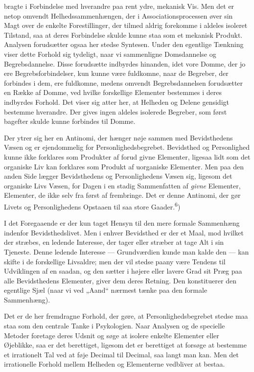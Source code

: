 \documentclass[12pt,a4paper,openany]{book}
\newcommand{\opage}[1]{\marginnote{\footnotesize\textit{[#1]}}}
\begin{document}
bragte i Forbindelse med hverandre paa rent ydre, mekanisk Vis. Men det er
netop omvendt Helhedssammenhængen, der i Associationsprocessen øver sin Magt
over de enkelte Forestillinger, der tilmed aldrig forekomme i aldeles isoleret
Tilstand, saa at deres Forbindelse skulde kunne staa som et mekanisk Produkt.
Analysen forudsætter ogsaa her stedse Syntesen. Under den egentlige Tænkning
viser dette Forhold sig tydeligt, naar vi sammenligne Domsdannelse og
Begrebsdannelse. Disse forudsætte indbyrdes hinanden, idet vore Domme, der jo
ere Begrebsforbindelser, kun kunne være fuldkomne, naar de Begreber, der
forbindes i dem, ere fuldkomne, medens omvendt Begrebsdannelsen forudsætter en
Række af Domme, ved hvilke forskellige Elementer bestemmes i deres indbyrdes
Forhold. Det viser sig atter her, at Helheden og Delene gensidigt bestemme
hverandre. Der gives ingen aldeles isolerede Begreber, som først bagefter
skulde kunne forbindes til Domme.

Der ytrer sig her en Antinomi, der hænger nøje sammen med Bevidsthedens Væsen
og er ejendommelig for Personlighedsbegrebet. Bevidsthed og Personlighed kunne
ikke forklares som Produkter af forud givne Elementer, ligesaa lidt som det
organiske Liv kan forklares som Produkt af uorganiske Elementer. Men paa den
anden Side lægger Bevidsthedens og Personlighedens Væsen sig, ligesom det
organiske Livs Væsen,
\opage{10}for Dagen i en stadig Sammenfatten af \textit{givne} Elementer,
Elementer, de ikke selv fra først af frembringe. Det er denne Antinomi, der gør
Livets og Personlighedens Opstaaen til saa store Gaader.\textsuperscript{6})

I det Foregaaende er der kun taget Hensyn til den mere formale Sammenhæng
indenfor Bevidsthedslivet. Men i enhver Bevidsthed er der et Maal, mod hvilket
der stræbes, en ledende Interesse, der tager eller stræber at tage Alt i sin
Tjeneste. Denne ledende Interesse --- Grundværdien kunde man kalde den --- kan
skifte i de forskellige Livsaldre; men der vil stedse paany være Tendens til
Udviklingen af en saadan, og den sætter i højere eller lavere Grad sit Præg paa
alle Bevidsthedens Elementer, giver dem deres Retning. Den konstituerer den
egentlige Sjæl (naar vi ved „Aand“ nærmest tænke paa den formale Sammenhæng).

Det er de her fremdragne Forhold, der gøre, at Personlighedsbegrebet stedse maa
staa som den centrale Tanke i Psykologien. Naar Analysen og de specielle
Metoder foretage deres Udsnit og søge at isolere enkelte Elementer eller
Øjeblikke, saa er det berettiget, ligesom det er berettiget at forsøge at
bestemme et irrationelt Tal ved at føje Decimal til Decimal, saa langt man kan.
Men det irrationelle Forhold mellem Helheden og Elementerne vedbliver at bestaa.
\end{document}
